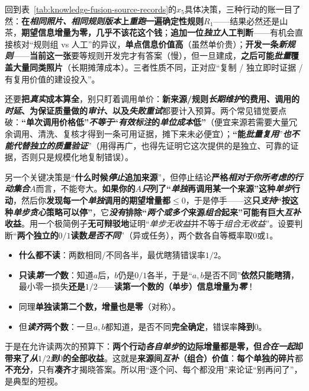 回到表~\ref{tab:knowledge-fusion-source-records}的$x_5$具体决策，三种行动的账一目了然：\textbf{在\emph{相同照片、相同规则版本}上\emph{重跑}一遍确定性规则$R_1$}——结果必然还是山茶，\textbf{期望信息增量为零，几乎不该花这个钱}；\textbf{追加一位\emph{独立}人工判断}——有机会直接核对“规则组 vs 人工”的异议，\textbf{单点信息价值高}（虽然单价贵）；\textbf{开发一条\emph{新规则}}——\textbf{当前这一张}要等规则开发完才有答案（慢），但一旦建成，\textbf{之后可能\emph{批量}覆盖大量同类照片}（长期摊薄成本）。三者性质不同，正对应“复制 / 独立即时证据 / 有复用价值的建设投入”。

还要\textbf{把\emph{真实}成本算全}，别只盯着调用单价：\textbf{新来源/规则\emph{长期维护}的费用、调用的\emph{时延}、为保证质量做的\emph{审计}、以及\emph{失败重试}}都要计入预算。两个常见错觉要点破：\textbf{“单次调用价格低”\emph{不等于}“\emph{有效标注}的\emph{单位成本}低”}（便宜来源若需要大量冗余调用、清洗、复核才得到一条可用证据，摊下来未必便宜）；\textbf{“能\emph{批量复用}}”\textbf{\emph{也不能代替}\emph{独立的质量验证}}”（用得再广，也得先证明它这次提供的是独立、可靠的证据，否则只是规模化地复制错误）。

另一个关键决策是“\textbf{什么时候\emph{停止}追加来源}”，但停止结论\textbf{严格\emph{相对于你所考虑的行动集合}}$A$而言，不能夸大。\textbf{如果你的$A$\emph{只}列了“\emph{单独}再调用某一个来源”这种\emph{单步}行动}，然后你\textbf{发现每一个\emph{单独}调用的期望增量都$\leq0$}，于是停手——这\textbf{只\emph{支持}“按这种\emph{单步贪心}策略可以停”}，它\textbf{\emph{没有}排除“\emph{两个或多个}来源\emph{组合}起来”可能有巨大\emph{互补}收益}。用一个极简例子\textbf{无可辩驳地}证明“\emph{单步无收益}并不等于\emph{组合无收益}”。设要判断“\textbf{两个独立的$0/1$读数\emph{是否\emph{不同}}}”（异或任务），两个数各自等概率取$0$或$1$。
\begin{itemize}\item \textbf{什么都不读}：两数相同/不同各半，最优瞎猜错误率$1/2$。\item \textbf{只读\emph{第一个}数}：知道$a$后，$b$仍是$0/1$各半，于是“$a,b$是否不同”\textbf{依然只能瞎猜}，最小零一损失\textbf{还是$1/2$}——\textbf{读第一个数的（单步）信息增量为\emph{零}}！\item 同理\textbf{单独读第二个数，增量也是零}（对称）。\item 但\textbf{\emph{读齐}两个数}：一旦$a,b$都知道，是否不同\textbf{完全确定}，错误率\textbf{降到$0$}。\end{itemize}
于是在允许读两次的预算下：\textbf{两个行动\emph{各自单步}的边际增量都是零，但\emph{合在一起}却带来了\emph{从$1/2$到$0$}的全部收益}。这就是\textbf{来源间\emph{互补}（组合）价值}：\textbf{每个单独的碎片}都\textbf{不充分}，只有\textbf{凑齐}才揭晓答案。所以用“逐个问、每个都没用”来论证“别再问了”，是典型的短视。

